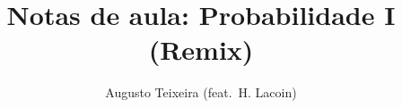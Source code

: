 \documentclass[reqno, final]{book}
\begin{document}
\title{Notas de aula: Probabilidade I (Remix)}
\author{Augusto Teixeira (feat.\ H. Lacoin)}

\frontmatter

\maketitle

\mbox{}
\thispagestyle{empty}

\newpage

\setcounter{page}{1}




\newpage

\thispagestyle{empty}

\tableofcontents

\mainmatter










\clearpage

\nocite{}





\printindex
\end{document}
